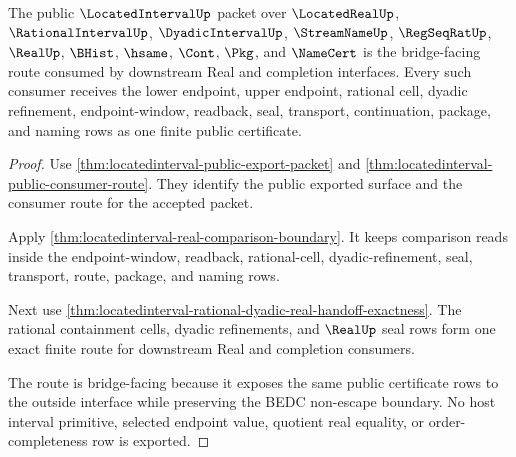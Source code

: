 \begin{theorem}
\label{thm:located-interval-bridged-public-route}
The public $\LocatedIntervalUp$ packet over $\LocatedRealUp$, $\RationalIntervalUp$, $\DyadicIntervalUp$, $\StreamNameUp$, $\RegSeqRatUp$, $\RealUp$, $\BHist$, $\hsame$, $\Cont$, $\Pkg$, and $\NameCert$ is the bridge-facing route consumed by downstream Real and completion interfaces. Every such consumer receives the lower endpoint, upper endpoint, rational cell, dyadic refinement, endpoint-window, readback, seal, transport, continuation, package, and naming rows as one finite public certificate.
\end{theorem}
\begin{proof}
Use \autoref{thm:locatedinterval-public-export-packet} and \autoref{thm:locatedinterval-public-consumer-route}. They identify the public exported surface and the consumer route for the accepted packet.

Apply \autoref{thm:locatedinterval-real-comparison-boundary}. It keeps comparison reads inside the endpoint-window, readback, rational-cell, dyadic-refinement, seal, transport, route, package, and naming rows.

Next use \autoref{thm:locatedinterval-rational-dyadic-real-handoff-exactness}. The rational containment cells, dyadic refinements, and $\RealUp$ seal rows form one exact finite route for downstream Real and completion consumers.

The route is bridge-facing because it exposes the same public certificate rows to the outside interface while preserving the BEDC non-escape boundary. No host interval primitive, selected endpoint value, quotient real equality, or order-completeness row is exported.
\end{proof}


